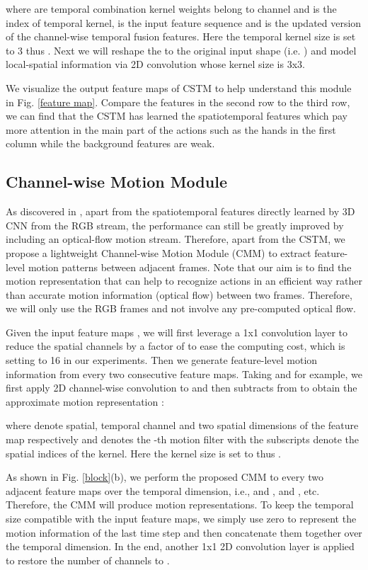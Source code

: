 \documentclass[10pt,twocolumn,letterpaper]{article}
\begin{document}
	
	where  are temporal combination kernel weights belong to channel  and  is the index of temporal kernel,  is the input feature sequence and  is the updated version of the channel-wise temporal fusion features. Here the temporal kernel size is set to 3 thus . Next we will reshape the  to the original input shape (i.e. ) and model local-spatial information via 2D convolution whose kernel size is 3x3.
	
	We visualize the output feature maps of CSTM to help understand this module in Fig. \ref{feature map}. Compare the features in the second row to the third row, we can find that the CSTM has learned the spatiotemporal features which pay more attention in the main part of the actions such as the hands in the first column while the background features are weak.
	
	\subsection{Channel-wise Motion Module}
	As discovered in \cite{varol2018long,carreira2017quo}, apart from the spatiotemporal features directly learned by 3D CNN from the RGB stream, the performance can still be greatly improved by including an optical-flow motion stream. Therefore, apart from the CSTM, we propose a lightweight Channel-wise Motion Module (CMM) to extract feature-level motion patterns between adjacent frames. Note that our aim is to find the motion representation that can help to recognize actions in an efficient way rather than accurate motion information (optical flow) between two frames. Therefore, we will only use the RGB frames and not involve any pre-computed optical flow.
	
	Given the input feature maps , we will first leverage a 1x1 convolution layer to reduce the spatial channels by a factor of  to ease the computing cost, which is setting to 16 in our experiments. Then we generate feature-level motion information from every two consecutive feature maps. Taking  and  for example, we first apply 2D channel-wise convolution to  and then subtracts from  to obtain the approximate motion representation :
	
	
	where  denote spatial, temporal channel and two spatial dimensions of the feature map respectively and  denotes the -th motion filter with the subscripts  denote the spatial indices of the kernel. Here the kernel size is set to  thus .
	
	As shown in Fig. \ref{block}(b), we perform the proposed CMM to every two adjacent feature maps over the temporal dimension, i.e.,  and ,  and , etc. Therefore, the CMM will produce  motion representations. To keep the temporal size compatible with the input feature maps, we simply use zero to represent the motion information of the last time step and then concatenate them together over the temporal dimension. In the end, another 1x1 2D convolution layer is applied to restore the number of channels to .
\end{document}
